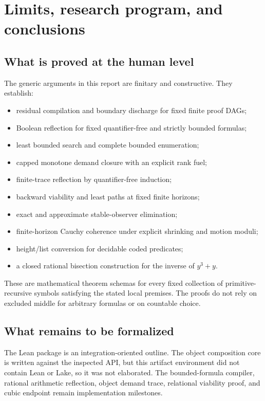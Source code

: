 \section{Limits, research program, and conclusions}

\subsection{What is proved at the human level}

The generic arguments in this report are finitary and constructive.  They establish:

\begin{itemize}
\item residual compilation and boundary discharge for fixed finite proof DAGs;
\item Boolean reflection for fixed quantifier-free and strictly bounded formulas;
\item least bounded search and complete bounded enumeration;
\item capped monotone demand closure with an explicit rank fuel;
\item finite-trace reflection by quantifier-free induction;
\item backward viability and least paths at fixed finite horizons;
\item exact and approximate stable-observer elimination;
\item finite-horizon Cauchy coherence under explicit shrinking and motion moduli;
\item height/list conversion for decidable coded predicates;
\item a closed rational bisection construction for the inverse of \(y^3+y\).
\end{itemize}

These are mathematical theorem schemas for every fixed collection of primitive-recursive symbols satisfying the stated local premises.  The proofs do not rely on excluded middle for arbitrary formulas or on countable choice.

\subsection{What remains to be formalized}

The Lean package is an integration-oriented outline.  The object composition core is written against the inspected API, but this artifact environment did not contain Lean or Lake, so it was not elaborated.  The bounded-formula compiler, rational arithmetic reflection, object demand trace, relational viability proof, and cubic endpoint remain implementation milestones.


